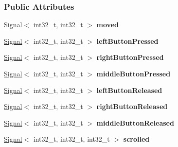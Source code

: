 \subsubsection*{Public Attributes}
\begin{DoxyCompactItemize}
\item 
\hyperlink{a00065}{Signal}$<$ int32\+\_\+t, int32\+\_\+t $>$ {\bfseries moved}\hypertarget{a00057_a2f8435311a86e43ce712428068be4388}{}\label{a00057_a2f8435311a86e43ce712428068be4388}

\item 
\hyperlink{a00065}{Signal}$<$ int32\+\_\+t, int32\+\_\+t $>$ {\bfseries left\+Button\+Pressed}\hypertarget{a00057_a8a124384858018ed62ea1c4f09bae103}{}\label{a00057_a8a124384858018ed62ea1c4f09bae103}

\item 
\hyperlink{a00065}{Signal}$<$ int32\+\_\+t, int32\+\_\+t $>$ {\bfseries right\+Button\+Pressed}\hypertarget{a00057_a8f70c2524cbf2207b30ac872d5d10037}{}\label{a00057_a8f70c2524cbf2207b30ac872d5d10037}

\item 
\hyperlink{a00065}{Signal}$<$ int32\+\_\+t, int32\+\_\+t $>$ {\bfseries middle\+Button\+Pressed}\hypertarget{a00057_a5600598fd751ba99ef2d308264519fcb}{}\label{a00057_a5600598fd751ba99ef2d308264519fcb}

\item 
\hyperlink{a00065}{Signal}$<$ int32\+\_\+t, int32\+\_\+t $>$ {\bfseries left\+Button\+Released}\hypertarget{a00057_ac76d41b9a0bcf246c4d8cf1455fa8672}{}\label{a00057_ac76d41b9a0bcf246c4d8cf1455fa8672}

\item 
\hyperlink{a00065}{Signal}$<$ int32\+\_\+t, int32\+\_\+t $>$ {\bfseries right\+Button\+Released}\hypertarget{a00057_ae04e740f5f8052d913b22b3142f69433}{}\label{a00057_ae04e740f5f8052d913b22b3142f69433}

\item 
\hyperlink{a00065}{Signal}$<$ int32\+\_\+t, int32\+\_\+t $>$ {\bfseries middle\+Button\+Released}\hypertarget{a00057_aa4ef1f528375a47a2678fb2d410bf1a7}{}\label{a00057_aa4ef1f528375a47a2678fb2d410bf1a7}

\item 
\hyperlink{a00065}{Signal}$<$ int32\+\_\+t, int32\+\_\+t, int32\+\_\+t $>$ {\bfseries scrolled}\hypertarget{a00057_a56ae78f14bc31a3b582f91d73ddf2b23}{}\label{a00057_a56ae78f14bc31a3b582f91d73ddf2b23}

\end{DoxyCompactItemize}

